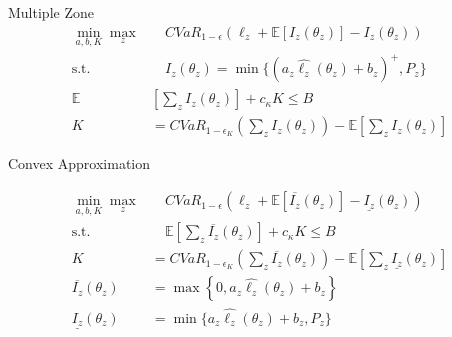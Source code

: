 \documentclass{beamer}
\begin{document}
\begin{frame}{Multiple Zone}
    \begin{align}
        \min_{a,b,K} \max_z &\quad CVaR_{1-\epsilon}\left (\ell_z + \mathbb{E}[I_z(\theta_z)] - I_z(\theta_z) \right )\\
        \text{s.t.   } &\quad I_z(\theta_z) = \min \{ (a_z\hat{\ell_z}(\theta_z) + b_z)^+,P_z \} \\
        \mathbb{E} &\left [ \sum_z I_z(\theta_z) \right ] + c_{\kappa} K \leq B\\
        K  &= CVaR_{1-\epsilon_K} \left( \sum_z I_z(\theta_z) \right ) - \mathbb{E}\left [ \sum_z I_z(\theta_z) \right]
      \end{align}
\end{frame}

\begin{frame}{Convex Approximation}

\begin{align}
      \min_{a,b,K} \max_z &\quad CVaR_{1-\epsilon}\left (\ell_z + \mathbb{E}\left[ \overline{I_z}(\theta_z) \right ] - \underline{I_z}(\theta_z) \right )\\
      \text{s.t.   } &\quad \mathbb{E}\left [ \sum_z \overline{I_z}(\theta_z) \right ] + c_{\kappa} K \leq B\\
      K  &= CVaR_{1-\epsilon_K} \left( \sum_z \overline{I_z}(\theta_z) \right ) - \mathbb{E}\left [ \sum_z \underline{I_z}(\theta_z) \right]\\
      \overline{I_z}(\theta_z) &= \max \left \{ 0,a_z\hat{\ell_z}(\theta_z) + b_z\right \} \\
      \underline{I_z}(\theta_z) &= \min \{ a_z\hat{\ell_z}(\theta_z) + b_z, P_z \}
    \end{align}
\hyperlink{convex-approx}{}
\end{frame}
\end{document}
